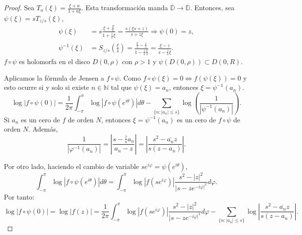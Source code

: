 \begin{proof}
    Sea $T_a(\xi) = \frac{\xi + a}{1 + \overline{a}\xi}$.
    Esta transformación manda $\overline{\mathbb{D}} \to \overline{\mathbb{D}}$.
    Entonces, sea $\psi(\xi) = sT_{z/s}(\xi)$,
    \begin{align*}
        \psi(\xi)      & = s\frac{\xi + \frac{Z}{s}}{1 + \frac{\overline{z}}{s}\xi} = \frac{s(\xi s + z)}{s+\overline{z}\xi} \Rightarrow \psi(0) = z,                                 \\
        \psi^{-1}(\xi) & = S_{z/s}\left(\frac{\xi}{s}\right) = \frac{\frac{\xi}{s}-\frac{z}{s}}{1-\frac{\overline{z}}{s}\frac{\xi}{s}} = \frac{\xi-z}{s - \frac{\overline{z}}{s}\xi}.
    \end{align*}
    $f \circ \psi$ es holomorfa en el disco $D(0, \rho)$ con $\rho > 1$ y $\psi(D(0, \rho)) \subset D(0, R)$.

    Aplicamos la fórmula de Jensen a $f \circ \psi$.
    Como $f \circ \psi(\xi) = 0 \Leftrightarrow f(\psi(\xi)) = 0$ y esto ocurre si y solo si existe $n \in \mathbb{N}$ tal que $\psi(\xi) = a_n$, entonces $\xi = \psi^{-1}(a_n)$.
    $$\log|f \circ \psi(0)| = \frac{1}{2\pi} \int_{-\pi}^\pi \log|f \circ \psi(e^{i\theta})|d\theta - \sum_{\{n : |a_n| \leq s\}} \log\left(\frac{1}{|\psi^{-1}(a_n)|}\right).$$
    Si $a_n$ es un cero de $f$ de orden $N$, entonces $\xi = \psi^{-1}(a_n)$ es un cero de $f \circ \psi$ de orden $N$.
    Además,
    $$\frac{1}{|\varphi^{-1}(a_n)|} = \left|\frac{s-\frac{\overline{z}}{s}a_n}{a_n-z}\right| = \left|\frac{s^2-\overline{a_n}z}{s(z-a_n)}\right|.$$

    Por otro lado, haciendo el cambio de variable $se^{i\varphi} = \psi(e^{i\theta})$,
    $$\int_{-\pi}^\pi \log|f \circ \psi(e^{i\theta})|d\theta = \int_{-\pi}^\pi \log|f(se^{i\varphi})|\frac{s^2-|z|^2}{|s-ze^{-i\varphi|^2}}d\varphi.$$
    Por tanto:
    $$\log|f \circ \psi(0)| = \log|f(z)| = \frac{1}{2\pi} \int_{-\pi}^\pi \log|f(se^{i\varphi})|\frac{s^2-|z|^2}{|s-ze^{-i\varphi|^2}}d\varphi - \sum_{\{n : |a_n| \leq s\}} \log\left|\frac{s^2-\overline{a_n}z}{s(z-a_n)}\right|.$$
\end{proof}

